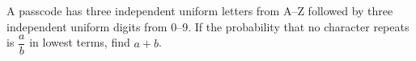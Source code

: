 A passcode has three independent uniform letters from A--Z followed by three independent uniform digits from 0--9. If the probability that no character repeats is $\dfrac{a}{b}$ in lowest terms, find $a+b$.
